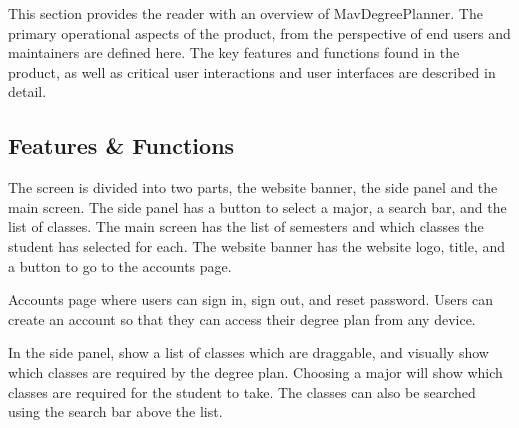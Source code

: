 
This section provides the reader with an overview of MavDegreePlanner.
The primary operational aspects of the product, from the perspective
of end users and maintainers are defined here. The key features and
functions found in the product, as well as critical user interactions
and user interfaces are described in detail.

\subsection{Features \& Functions}

The screen is divided into two parts, the website banner, the side
panel and the main screen. The side panel has a button to select a
major, a search bar, and the list of classes. The main screen has
the list of semesters and which classes the student has selected
for each. The website banner has the website logo, title, and
a button to go to the accounts page.

Accounts page where users can sign in, sign out, and reset password.
Users can create an account so that they can access their degree plan
from any device.

In the side panel, show a list of classes which are draggable,
and visually show which classes are required by the degree plan.
Choosing a major will show which classes are required for the student
to take. The classes can also be searched using the search bar above the list.

